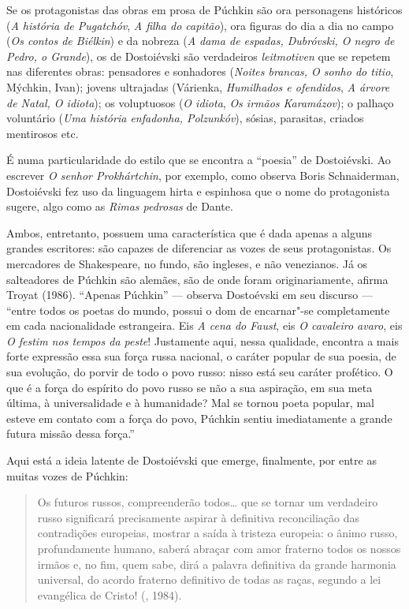 Se os protagonistas das obras em prosa de Púchkin são ora personagens
históricos (\emph{A história de Pugatchóv}, \emph{A filha do capitão}),
ora figuras do dia a dia no campo (\emph{Os contos de Biélkin}) e da
nobreza (\emph{A dama de espadas, Dubróvski, O negro de Pedro, o
Grande}), os de Dostoiévski são verdadeiros \emph{leitmotiven}
que se repetem nas diferentes obras: pensadores e sonhadores
(\emph{Noites brancas, O sonho do titio}, Mýchkin, Ivan); jovens ultrajadas (Várienka, \emph{Humilhados e ofendidos}, \emph{A árvore de Natal, O idiota}); os voluptuosos (\emph{O idiota}, \emph{Os irmãos Karamázov}); o palhaço
voluntário (\emph{Uma história enfadonha, Polzunkóv}), sósias,
parasitas, criados mentirosos etc.

É numa particularidade do estilo que se encontra a ``poesia'' de Dostoiévski. Ao escrever \emph{O senhor Prokhártchin}, por exemplo, como observa Boris Schnaiderman, Dostoiévski fez uso da linguagem hirta e espinhosa que o nome do protagonista sugere, algo como as \emph{Rimas pedrosas} de Dante.

Ambos, entretanto, possuem uma característica que é dada apenas
a alguns grandes escritores: são capazes de diferenciar as vozes
de seus protagonistas. Os mercadores de Shakespeare, no fundo,
são ingleses, e não venezianos. Já os salteadores de Púchkin são
alemães, são de onde foram originariamente, afirma Troyat (1986).
``Apenas Púchkin'' --- observa Dostoévski em seu discurso ---
``entre todos os poetas do mundo, possui o dom de encarnar"-se
completamente em cada nacionalidade estrangeira. Eis \emph{A
cena do Faust}, eis \emph{O cavaleiro avaro}, eis \emph{O festim
nos tempos da peste}! Justamente aqui, nessa qualidade, encontra
a mais forte expressão essa sua força russa nacional, o caráter
popular de sua poesia, de sua evolução, do porvir de todo o povo
russo: nisso está seu caráter profético. O que é a força do espírito do povo russo se não a sua aspiração, em sua meta última, à universalidade e à humanidade? Mal se tornou poeta popular, mal esteve em contato com a força do povo, Púchkin sentiu imediatamente a grande futura missão dessa força.''

Aqui está a ideia latente de Dostoiévski que emerge, finalmente, por
entre as muitas vozes de Púchkin:

\begin{quotation}
Os futuros russos, compreenderão todos\ldots{} que se tornar um verdadeiro russo significará precisamente aspirar à definitiva reconciliação das contradições europeias, mostrar a saída à tristeza europeia: o ânimo russo, profundamente humano, saberá abraçar com amor fraterno todos os nossos irmãos e, no fim, quem sabe, dirá a palavra definitiva da grande harmonia universal, do acordo fraterno definitivo de todas as raças, segundo a lei evangélica de Cristo! (, 1984).
\end{quotation}

